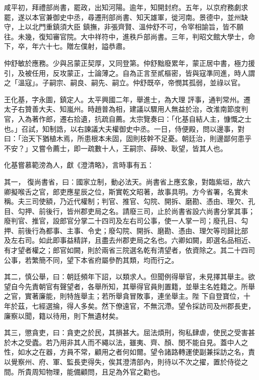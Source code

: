 \begin{pinyinscope}
 咸平初，拜禮部尚書，罷政，出知河陽。逾年，知開封府。五年，以京府務劇求罷，遂以本官兼御史中丞，尋遷刑部尚書、知天雄軍，徙河南。景德中，並州缺守，上以北門重鎮須大臣
 鎮撫，非張齊賢、溫仲舒不可，令宰相諭旨，皆不願往。未幾，復知審官院。大中祥符中，進秩戶部尚書。三年，判昭文館大學士，命下，卒，年六十七。贈左僕射，謚恭肅。



 仲舒敏於應務。少與呂蒙正契厚，又同登第。仲舒黜廢累年，蒙正居中書，極力援引，及被任用，反攻蒙正，士論薄之。自為正言至貳樞密，皆與寇準同進，時人謂之「溫寇」。子嗣宗、嗣良、嗣先、嗣立。仲舒既卒，帝憫其孤弱，並祿以官。



 王化基，字永圖，鎮定人。太平興國二年，舉進士，為大理
 評事，通判常州。遷太子右贊善大夫、知嵐州。時趙普為相，建議以驟用人無益於治，改淮南節度判官，入為著作郎，遷右拾遺，抗疏自薦。太宗覽奏曰：「化基自結人主，慷慨之士也。」召試，知制誥，以右諫議大夫權御史中丞。一日，侍便殿，問以邊事，對曰：「治天下猶植木焉，所患根本未固，固則枝幹不足憂。朝廷治，則邊鄙何患乎不安？」又嘗令薦士，即一疏數十人，王嗣宗、薛映、耿望，皆其人也。



 化基嘗慕範滂為人，獻《澄清略》，言時事有五：



 其一，
 復尚書省，曰：國家立制，動必法天。尚書省上應玄象，對臨紫垣，故六卿擬喉舌之官，郎吏應星辰之位，斯實乾文昭著，故事具明。方今省署，名實未稱。夫三司使額，乃近代權制；判官、推官、勾院、開拆、磨勘、憑由、理欠、孔目、勾押、前後行，皆州郡吏局之名。請廢三司，止於尚書省設六尚書分掌其事；廢判官、推官，設郎官分掌二十四司及左右司公事，使一人掌一司；廢孔目、勾押、前後行為都事、主事、令史；廢勾院、開拆、磨勘、憑由、理欠等司歸比部
 及左右司。如此即事益精詳，且盡去州郡吏局之名也。六卿如闕，即選名品相近、有才望者權之；郎官如闕，則於兩省三院選名乾有清望者，依資除之。其二十四司公事，若繁簡不同，望下本省府屬參酌其類，均而行之。



 其二，慎公舉，曰：朝廷頻年下詔，以類求人。但聞例得舉官，未見擇其舉主。欲望自今先責朝官有聲望者，各舉所知，其舉得官員則置籍，並舉主名姓籍之。所舉之官，實著廉能，則特旌舉主；若所舉貪冒敗事，連坐舉主。陛
 下自登寶位，十年於茲，七經選掄，得人多矣。然下僚遠官，不無沉滯。望令採訪司及州郡長吏，廉察以聞，籍以待用，則下無遺材矣。



 其三，懲貪吏，曰：貪吏之於民，其損甚大。屈法煩刑，徇私肆虐，使民之受害甚於木之受蠹。若乃用非其人而不繩以法，雖夷、齊、顏、閔不能自見。蓋中人之性，如水之在器，方員不常，顧用之者何如爾。望令諸路轉運使副兼採訪之名，責以覺察州、府、軍、監長吏得失，俟其澄清部內，則待以不次之擢，置於侍從之
 間。所貴周知物理，能備顧問，且足為外官之勸也。




\end{pinyinscope}
